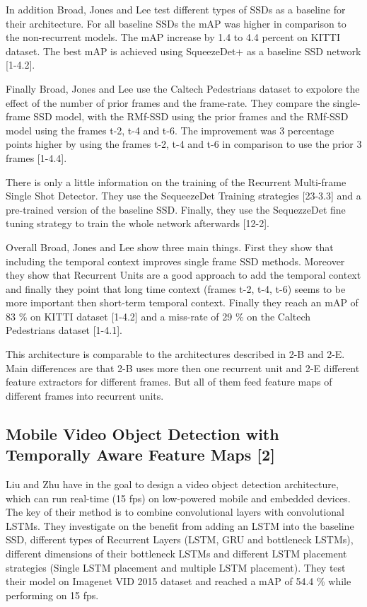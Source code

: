 \documentclass[conference]{IEEEtran}
\begin{document}
In addition Broad, Jones and Lee test different types of SSDs as a baseline for their architecture. For all baseline SSDs the mAP was higher in comparison to the non-recurrent models. The mAP increase by 1.4 to 4.4 percent on KITTI dataset.  The best mAP is achieved using SqueezeDet+ \cite{b23} as a baseline SSD network [1-4.2].  \newline

Finally Broad, Jones and Lee use the Caltech Pedestrians dataset to expolore the effect of the number of prior frames and the frame-rate. They compare the single-frame SSD model, with the RMf-SSD using the prior frames and the RMf-SSD model using the frames t-2, t-4 and t-6. The improvement was 3 percentage points higher by using the frames t-2, t-4 and t-6 in comparison to use the prior 3 frames [1-4.4]. \newline  

There is only a little information on the training of the Recurrent Multi-frame Single Shot Detector. They use the SequeezeDet Training strategies [23-3.3] and a pre-trained version of the baseline SSD. Finally, they use the SequezzeDet fine tuning strategy to train the whole network afterwards [12-2]. \newline

Overall Broad, Jones and Lee show three main things. First they show that including the temporal context improves single frame SSD methods. Moreover they show that Recurrent Units are a good approach to add the temporal context and finally they point that long time context (frames t-2, t-4, t-6) seems to be more important then short-term temporal context. Finally they reach an mAP of 83 \% on KITTI dataset [1-4.2] and a miss-rate of 29 \% on the Caltech Pedestrians dataset [1-4.1]. \newline

This architecture is comparable to the architectures described in 2-B and 2-E. Main differences are that 2-B uses more then one recurrent unit and 2-E different feature extractors for different frames. But all of them feed feature maps of different frames into recurrent units. 
 
\subsection{Mobile Video Object Detection with Temporally Aware Feature Maps [2]}
Liu and Zhu have in \cite{b2} the goal to design a video object detection architecture, which can run real-time (15 fps) on low-powered mobile and embedded devices. The key of their method is to combine convolutional layers with convolutional LSTMs. They investigate on the benefit from adding an LSTM into the baseline SSD, different types of Recurrent Layers (LSTM, GRU and bottleneck LSTMs), different dimensions of their bottleneck LSTMs and different LSTM placement strategies (Single LSTM placement and multiple LSTM placement). They test their model on Imagenet VID 2015 dataset \cite{b35} and reached a mAP of 54.4 \% while performing on 15 fps.  \newline
\end{document}
